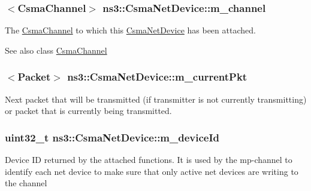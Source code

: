 \subsubsection[{\texorpdfstring{m\+\_\+channel}{m_channel}}]{$<${\bf Csma\+Channel}$>$ ns3\+::\+Csma\+Net\+Device\+::m\+\_\+channel\hspace{0.3cm}{\ttfamily [private]}}\hypertarget{classns3_1_1CsmaNetDevice_a5c3ecdf9a63006b106dff1c110e736ff}{}\label{classns3_1_1CsmaNetDevice_a5c3ecdf9a63006b106dff1c110e736ff}
The \hyperlink{classns3_1_1CsmaChannel}{Csma\+Channel} to which this \hyperlink{classns3_1_1CsmaNetDevice}{Csma\+Net\+Device} has been attached. \begin{DoxySeeAlso}{See also}
class \hyperlink{classns3_1_1CsmaChannel}{Csma\+Channel} 
\end{DoxySeeAlso}
\subsubsection[{\texorpdfstring{m\+\_\+current\+Pkt}{m_currentPkt}}]{$<${\bf Packet}$>$ ns3\+::\+Csma\+Net\+Device\+::m\+\_\+current\+Pkt\hspace{0.3cm}{\ttfamily [private]}}\hypertarget{classns3_1_1CsmaNetDevice_a83f2aa389f676dec6bd1ff056bd61942}{}\label{classns3_1_1CsmaNetDevice_a83f2aa389f676dec6bd1ff056bd61942}
Next packet that will be transmitted (if transmitter is not currently transmitting) or packet that is currently being transmitted. 
\subsubsection[{\texorpdfstring{m\+\_\+device\+Id}{m_deviceId}}]{\setlength{\rightskip}{0pt plus 5cm}uint32\+\_\+t ns3\+::\+Csma\+Net\+Device\+::m\+\_\+device\+Id\hspace{0.3cm}{\ttfamily [private]}}\hypertarget{classns3_1_1CsmaNetDevice_a8cfc188ed680554dfa0b70cc6fc5e5ba}{}\label{classns3_1_1CsmaNetDevice_a8cfc188ed680554dfa0b70cc6fc5e5ba}
Device ID returned by the attached functions. It is used by the mp-\/channel to identify each net device to make sure that only active net devices are writing to the channel 
